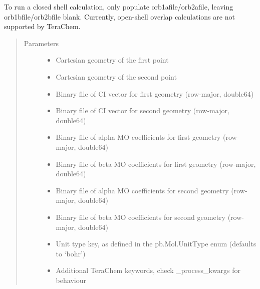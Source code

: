 \documentclass[letterpaper,10pt,english]{sphinxmanual}
\begin{document}
\begin{fulllineitems}
\begin{fulllineitems}
To run a closed shell calculation, only populate orb1afile/orb2afile, leaving orb1bfile/orb2bfile blank.
Currently, open-shell overlap calculations are not supported by TeraChem.
\begin{quote}\begin{description}
\item[{Parameters}] \leavevmode\begin{itemize}
\item {} 
 \textendash{} Cartesian geometry of the first point

\item {} 
 \textendash{} Cartesian geometry of the second point

\item {} 
 \textendash{} Binary file of CI vector for first geometry (row-major, double64)

\item {} 
 \textendash{} Binary file of CI vector for second geometry (row-major, double64)

\item {} 
 \textendash{} Binary file of alpha MO coefficients for first geometry (row-major, double64)

\item {} 
 \textendash{} Binary file of beta MO coefficients for first geometry (row-major, double64)

\item {} 
 \textendash{} Binary file of alpha MO coefficients for second geometry (row-major, double64)

\item {} 
 \textendash{} Binary file of beta MO coefficients for second geometry (row-major, double64)

\item {} 
 \textendash{} Unit type key, as defined in the pb.Mol.UnitType enum (defaults to ‘bohr’)

\item {} 
 \textendash{} Additional TeraChem keywords, check \_process\_kwargs for behaviour


\end{itemize}
\end{description}
\end{quote}
\end{fulllineitems}
\end{fulllineitems}
\end{document}
